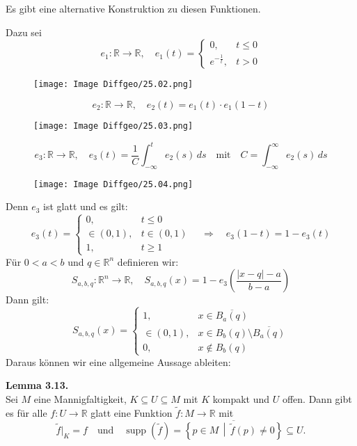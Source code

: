 \documentclass[fleqn, 12pt, letterpaper]{article}
\begin{document}
{Es gibt eine alternative Konstruktion zu diesen Funktionen.}

Dazu sei
\[
e_1 \colon \mathbb{R} \to \mathbb{R}, \quad
e_1(t) =
\begin{cases}
0, & t \leq 0 \\
e^{-\frac{1}{t}}, & t > 0
\end{cases}
\]
      \begin{figure}[H]
    \centering
    \texttt{[image: Image Diffgeo/25.02.png]}
 \end{figure}
\[
e_2 \colon \mathbb{R} \to \mathbb{R}, \quad
e_2(t) = e_1(t) \cdot e_1(1 - t)
\]
      \begin{figure}[H]
    \centering
    \texttt{[image: Image Diffgeo/25.03.png]}
 \end{figure}
\[
e_3 \colon \mathbb{R} \to \mathbb{R}, \quad
e_3(t) = \frac{1}{C} \int_{-\infty}^{t} e_2(s)\, ds
\quad \text{mit} \quad
C = \int_{-\infty}^{\infty} e_2(s)\, ds
\]
      \begin{figure}[H]
    \centering
    \texttt{[image: Image Diffgeo/25.04.png]}
 \end{figure}
{Denn $e_3$ ist glatt und es gilt:}
\[
e_3(t) =
\begin{cases}
0, & t \leq 0 \\
\in (0,1), & t \in (0,1) \\
1, & t \geq 1
\end{cases}
\quad \Rightarrow \quad
e_3(1 - t) = 1 - e_3(t)
\]
{Für $0 < a < b$ und $q \in \mathbb{R}^n$ definieren wir:}
\[
S_{a,b,q} \colon \mathbb{R}^n \to \mathbb{R}, \quad
S_{a,b,q}(x) = 1 - e_3 \left( \frac{|x - q| - a}{b - a} \right)
\]
{Dann gilt:}
\[
S_{a,b,q}(x) =
\begin{cases}
1, & x \in \overline{B_a(q)} \\
\in (0,1), & x \in B_b(q) \setminus \overline{B_a(q)} \\
0, & x \notin B_b(q)
\end{cases}
\]
{Daraus können wir eine allgemeine Aussage ableiten:}

\vspace{1em}

\textbf{Lemma 3.13.} \\
Sei $M$ eine Mannigfaltigkeit, $K \subseteq U \subseteq M$ mit $K$ kompakt und $U$ offen. Dann gibt es für alle $f \colon U \to \mathbb{R}$ glatt eine Funktion $\widetilde{f} \colon M \to \mathbb{R}$ mit
\[
\widetilde{f}\big|_K = f
\quad \text{und} \quad
\operatorname{supp}(\widetilde{f}) = \overline{\left\{ p \in M \,\middle|\, \widetilde{f}(p) \neq 0 \right\} }\subseteq U.
\]
\end{document}
